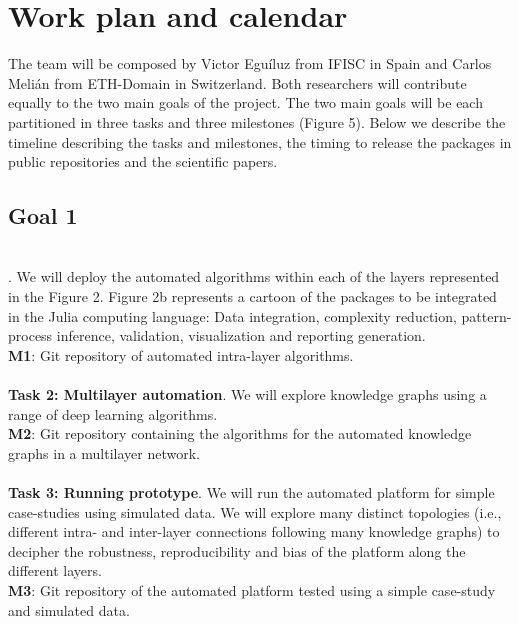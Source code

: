 \documentclass[authoryear,1p,12pt]{elsarticle}
\begin{document}
     \newpage
     \section{Work plan and calendar}

     \noindent The team will be composed by Victor Egu\'iluz from
     IFISC in Spain and Carlos Meli\'an from ETH-Domain in
     Switzerland. Both researchers will contribute equally to the two
     main goals of the project. The two main goals will be each
     partitioned in three tasks and three milestones (Figure 5). Below
     we describe the timeline describing the tasks and milestones, the
     timing to release the packages in public repositories and the
     scientific papers.
     \\
     \subsection{Goal 1}
     \\
     . We will deploy the
     automated algorithms within each of the layers represented in the
     Figure 2. Figure 2b represents a cartoon of the packages to be
     integrated in the Julia computing language: Data integration,
     complexity reduction, pattern-process
     inference, validation, visualization and reporting generation.\\
     {\bf M1}: Git repository of automated intra-layer algorithms.
     \\
     \\
     {\bf Task 2: Multilayer automation}. We will explore knowledge
     graphs using a range of deep learning algorithms.\\
     {\bf M2}: Git repository containing the algorithms for the
     automated knowledge graphs in a multilayer network.
     \\
     \\
     {\bf Task 3: Running prototype}. We will run the automated
     platform for simple case-studies using simulated data. We will
     explore many distinct topologies (i.e., different intra- and
     inter-layer connections following many knowledge graphs) to
     decipher the robustness, reproducibility and bias of the platform
     along the different
     layers.\\
     {\bf M3}: Git repository of the automated platform tested using a
     simple case-study and simulated data.
     \\
\end{document}
